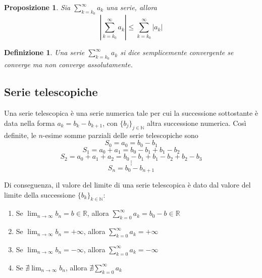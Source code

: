 \documentclass{article}
\newtheorem{proposition}{Proposizione}
\newtheorem{definition}{Definizione}
\begin{document}
        \vspace{10pt}
        \begin{proposition}
            Sia $\sum_{k = k_{0}}^{\infty} a_{k}$ una serie, allora
            \[
                \left| \sum_{k = k_{0}}^{\infty} a_{k} \right| \leq \sum_{k = k_{0}}^{\infty} |a_{k}|
            \]
        \end{proposition}
        
        \vspace{10pt}
        \begin{definition}
            Una serie $\sum_{k = k_{0}}^{\infty} a_{k}$ si dice semplicemente convergente se converge ma non converge assolutamente. 
        \end{definition}


        \vspace{10pt}
        \subsection{Serie telescopiche}
            Una serie telescopica è una serie numerica tale per cui la successione sottostante è data nella forma $a_{k} = b_{k} - b_{k+1}$, con $\{b_{j}\}_{j \in \mathbb{N}}$ altra successione numerica.
            Così definite, le $n$-esime somme parziali delle serie telescopiche sono
            \[ S_{0} = a_{0} = b_{0} - b_{1} \]
            \[ S_{1} = a_{0} + a_{1} = b_{0} - b_{1} + b_{1} - b_{2} \]
            \[ S_{2} = a_{0} + a_{1} + a_{2} = b_{0} - b_{1} + b_{1} - b_{2} + b_{2} - b_{3} \]
            \[ \vdots \]
            \[ S_{n} = b_{0} - b_{n+1} \]

            \vspace{10pt}
            Di conseguenza, il valore del limite di una serie telescopica è dato dal valore del limite della successione $\{b_{k}\}_{k \in \mathbb{N}}$:
            \begin{enumerate}[label=(\arabic*)]
                \item Se $\displaystyle \lim_{n \rightarrow \infty} b_{n} = b \in \mathbb{R}$, allora $\displaystyle \sum_{k = 0}^{\infty} a_{k} = b_{0} - b \in \mathbb{R}$
                \item Se $\displaystyle \lim_{n \rightarrow \infty} b_{n} = +\infty$, allora $\displaystyle \sum_{k = 0}^{\infty} a_{k} = +\infty$
                \item Se $\displaystyle \lim_{n \rightarrow \infty} b_{n} = -\infty$, allora $\displaystyle \sum_{k = 0}^{\infty} a_{k} = -\infty$
                \item Se $\displaystyle \nexists \lim_{n \rightarrow \infty} b_{n}$, allora $\displaystyle \nexists \sum_{k = 0}^{\infty} a_{k}$
            \end{enumerate}
    
\end{document}
